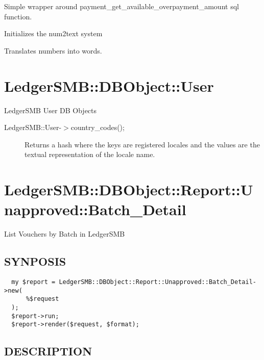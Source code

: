 \begin{description}
\begin{description}
\begin{description}
\begin{description}
\begin{description}
\begin{description}
\begin{description}
\begin{description}
\begin{description}
\begin{description}
Simple wrapper around payment\_get\_available\_overpayment\_amount sql function.


\item[{init}] \mbox{}

Initializes the num2text system


\item[{num2text}] \mbox{}

Translates numbers into words.

\section{LedgerSMB::DBObject::User\label{LedgerSMB::DBObject::User}}


LedgerSMB User DB Objects

\begin{description}

\item[{LedgerSMB::User-$>$country\_codes();}] \mbox{}

Returns a hash where the keys are registered locales and the values are the
textual representation of the locale name.

\end{description}
\section{LedgerSMB::DBObject::Report::Unapproved::Batch\_Detail\label{LedgerSMB::DBObject::Report::Unapproved::Batch_Detail}}


List Vouchers by Batch 
in LedgerSMB

\subsection*{SYNPOSIS\label{LedgerSMB::DBObject::Report::Unapproved::Batch_Detail_SYNPOSIS}}
\begin{verbatim}
  my $report = LedgerSMB::DBObject::Report::Unapproved::Batch_Detail->new(
      %$request
  );
  $report->run;
  $report->render($request, $format);
\end{verbatim}
\subsection*{DESCRIPTION\label{LedgerSMB::DBObject::Report::Unapproved::Batch_Detail_DESCRIPTION}}



\end{description}
\end{description}
\end{description}
\end{description}
\end{description}
\end{description}
\end{description}
\end{description}
\end{description}
\end{description}
